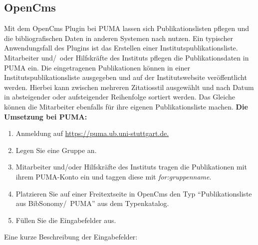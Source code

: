 \subsection{OpenCms}
\label{subsec:opencms}
Mit dem OpenCms Plugin bei PUMA lassen sich Publikationslisten pflegen und die bibliografischen Daten in anderen Systemen nach nutzen. Ein typischer Anwendungsfall des Plugins ist das Erstellen einer Institutspublikationsliste. Mitarbeiter und/~oder Hilfskräfte des Instituts pflegen die Publikationsdaten in PUMA ein. Die eingetragenen Publikationen können in einer Institutspublikationsliste ausgegeben und auf der Institutswebsite veröffentlicht werden. Hierbei kann zwischen mehreren Zitatiosstil ausgewählt und nach Datum in absteigender oder aufsteigender Reihenfolge sortiert werden. Das Gleiche können die Mitarbeiter ebenfalls für ihre eigenen Publikationsliste machen.\newline\newline
\textbf{Die Umsetzung bei PUMA:}\newline
\begin{enumerate}
\item  Anmeldung auf \url{https://puma.ub.uni-stuttgart.de.}
\item Legen Sie eine Gruppe an.
\item Mitarbeiter und/oder Hilfskräfte des Instituts tragen die Publikationen mit ihrem PUMA-Konto ein und taggen diese mit \textit{for:gruppenname}.
\item Platzieren Sie auf einer Freitextseite in OpenCms den Typ \enquote{Publikationsliste aus BibSonomy/~PUMA} aus dem Typenkatalog.
\item Füllen Sie die Eingabefelder aus.
\end{enumerate}
Eine kurze Beschreibung der Eingabefelder:\newline
